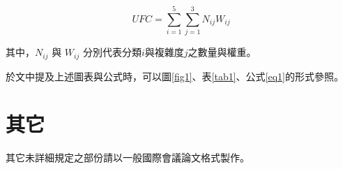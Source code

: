 \documentclass[conference,compsoc]{IEEEtran}
\begin{document}
\begin{equation}
UFC = \sum_{i=1}^{5} \sum_{j=1}^{3} N_{ij} W_{ij} \label{eq1}
\end{equation}

其中，$N_{ij}$ 與 $W_{ij}$ 分別代表分類$i$與複雜度$j$之數量與權重。
\medskip

於文中提及上述圖表與公式時，可以圖\ref{fig1}、表\ref{tab1}、公式\eqref{eq1}的形式參照。


\section{其它}
其它未詳細規定之部份請以一般國際會議論文格式製作。



%
%



%
%
\end{document}
